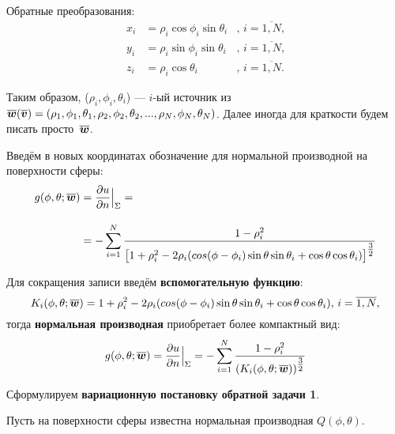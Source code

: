 Обратные преобразования:
\begin{equation}
	\begin{aligned}
		x_i
		&=
		\rho_i \cos{\phi_i} \sin{\theta_i}
		&\text{, }
		i=\overline{1,N}
		\text{,}
		\\[10pt]
		y_i
		&=
		\rho_i \sin{\phi_i} \sin{\theta_i}
		&\text{, }
		i=\overline{1,N}
		\text{,}
		\\[10pt]
		z_i
		&=
		\rho_i \cos{\theta_i}
		&\text{, }
		i=\overline{1,N}
		\text{.}
	\end{aligned}
\end{equation}

Таким образом, ($\rho_i, \phi_i, \theta_i$) --- $i$-ый источник из $\boldsymbol{\overline{w}}(\boldsymbol{\overline{v}})=(\rho_1,\phi_1,\theta_1,\rho_2,\phi_2,\theta_2,...,\rho_N,\phi_N,\theta_N)$. Далее иногда для краткости будем писать просто~$\boldsymbol{\overline{w}}$.

Введём в новых координатах обозначение для нормальной производной на поверхности сферы:
\begin{equation}
	\begin{split}
		g(\phi, \theta; \boldsymbol{\overline{w}}) &=
		\frac{\partial u}{\partial n}
		\Big|_\Sigma =\\[10pt]
		&=
		-
		\sum_{i = 1}^{N} \frac{1 - \rho_i^2}
		{
			\big[
			1 + \rho_i^2 - 2\rho_i
			(cos(\phi - \phi_i)\sin\theta \sin\theta_i + \cos\theta \cos\theta_i
			)
			\big]^{\tfrac{3}{2}}}
	\end{split}
\end{equation}

Для сокращения записи введём \textbf{вспомогательную функцию}:
\begin{equation}
	K_i(\phi, \theta; \boldsymbol{\overline{w}}) = 1 + \rho_i^2 - 2\rho_i(cos(\phi - \phi_i)\sin\theta \sin\theta_i + \cos\theta \cos\theta_i)\text{, }i=\overline{1,N}\text{,}
\end{equation}
тогда \textbf{нормальная производная} приобретает более компактный вид:
\begin{equation}
	\begin{split}
		g(\phi, \theta; \boldsymbol{\overline{w}}) =
		\frac{\partial u}{\partial n} \Big|_\Sigma =
		-
		\sum_{i = 1}^{N}
		\frac{1 - \rho_i^2}
		{(K_i(\phi, \theta; \boldsymbol{\overline{w}}))^{\tfrac{3}{2}}}
	\end{split}
\end{equation}

Сформулируем \textbf{вариационную постановку обратной задачи 1}.

Пусть на поверхности сферы известна нормальная производная $Q(\phi, \theta)$.

